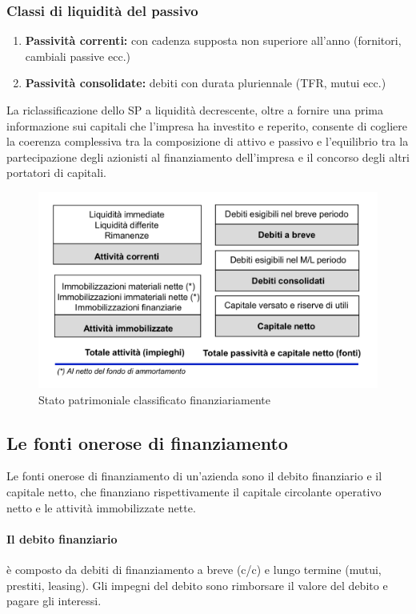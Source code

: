 \documentclass{report}
\begin{document}
	\subsubsection{Classi di liquidità del passivo}
	\begin{enumerate}
		\item \textbf{Passività correnti:} con cadenza supposta non superiore all'anno (fornitori, cambiali passive ecc.)
		\item \textbf{Passività consolidate:} debiti con durata pluriennale (TFR, mutui ecc.)
	\end{enumerate}
	La riclassificazione dello SP a liquidità decrescente, oltre a fornire una prima informazione sui capitali che l'impresa ha investito e reperito, consente di cogliere la coerenza complessiva tra la composizione di attivo e passivo e l'equilibrio tra la partecipazione degli azionisti al finanziamento dell'impresa e il concorso degli altri portatori di capitali.
	\newline
	\begin{figure}[h]
		\centering
		\includegraphics[width=0.7\linewidth]{sp}
		\caption{Stato patrimoniale classificato finanziariamente}
		\label{fig:sp}
	\end{figure}
	\subsection{Le fonti onerose di finanziamento}
	Le fonti onerose di finanziamento di un'azienda sono il debito finanziario e il capitale netto, che finanziano rispettivamente il capitale circolante operativo netto e le attività immobilizzate nette.
	\paragraph{Il debito finanziario} è composto da debiti di finanziamento a breve (c/c) e lungo termine (mutui, prestiti, leasing). Gli impegni del debito sono rimborsare il valore del debito e pagare gli interessi.
\end{document}
